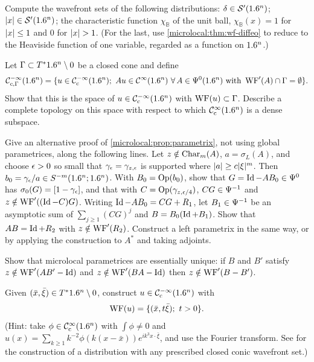\begin{exercise}\label{microlocal:ex:wf-examples}
  Compute the wavefront sets of the following distributions: $\delta\in\mathcal{S}'(1.6^n)$;
  $\lvert x\rvert\in\mathcal{S}'(1.6^n)$; the characteristic function $\chi_{\mathbb B}$ of the
  unit ball, $\chi_{\mathbb B}(x)=1$ for $\lvert x\rvert\le1$ and $0$ for $\lvert x\rvert>1$.
  (For the last, use \cref{microlocal:thm:wf-diffeo} to reduce to the
  Heaviside function of one variable, regarded as a function on $1.6^n$.)
\end{exercise}

\begin{exercise}\label{microlocal:ex:wf-gamma}
  Let $\Gamma\subset T^*1.6^n\setminus0$ be a closed cone and define
  \begin{equation*}
    \mathcal C^{-\infty}_{c,\Gamma}(1.6^n)=\{u\in\mathcal{C}^{-\infty}_{\mathrm{c}}(1.6^n);\
    Au\in\mathcal{C}^\infty(1.6^n)\ \forall\,A\in\Psi^{0}(1.6^n)\text{ with }\operatorname{WF}'(A)\cap\Gamma=\emptyset\}.
  \end{equation*}
  Show that this is the space of $u\in\mathcal{C}^{-\infty}_{\mathrm{c}}(1.6^n)$ with $\operatorname{WF}(u)\subset\Gamma$.
  Describe a complete topology on this space with respect to which
  $\mathcal{C}^\infty_{\mathrm{c}}(1.6^n)$ is a dense subspace.
\end{exercise}

\begin{exercise}\label{microlocal:ex:parametrix-direct}
  Give an alternative proof of \cref{microlocal:prop:parametrix}, not using
  global parametrices, along the following lines. Let $z\notin\operatorname{Char}_m(A)$, $a=\sigma_L(A)$,
  and choose $\epsilon>0$ so small that $\gamma_\epsilon=\gamma_{z,\epsilon}$ is supported
  where $\lvert a\rvert\ge c\lvert \xi\rvert^m$. Then $b_0=\gamma_\epsilon/a\in S^{-m}(1.6^n;1.6^n)$.
  With $B_0=\operatorname{Op}(b_0)$, show that $G=\operatorname{Id}-AB_0\in\Psi^{0}$ has
  $\sigma_0(G)=[1-\gamma_\epsilon]$, and that with $C=\operatorname{Op}(\gamma_{z,\epsilon/4})$,
  $CG\in\Psi^{-1}$ and $z\notin\operatorname{WF}'((\operatorname{Id}-C)G)$. Writing
  $\operatorname{Id}-AB_0=CG+R_1$, let $B_1\in\Psi^{-1}$ be an asymptotic sum of
  $\sum_{j\ge1}(CG)^j$ and $B=B_0(\operatorname{Id}+B_1)$. Show that $AB=\operatorname{Id}+R_2$ with
  $z\notin\operatorname{WF}'(R_2)$. Construct a left parametrix in the same way, or by
  applying the construction to $A^*$ and taking adjoints.
\end{exercise}

\begin{exercise}\label{microlocal:ex:uniqueness}
  Show that microlocal parametrices are essentially unique: if $B$ and $B'$
  satisfy $z\notin\operatorname{WF}'(AB'-\operatorname{Id})$ and $z\notin\operatorname{WF}'(BA-\operatorname{Id})$ then
  $z\notin\operatorname{WF}'(B-B')$.
\end{exercise}

\begin{exercise}\label{microlocal:ex:wf-ray}
  Given $(\bar x,\bar\xi)\in T^*1.6^n\setminus0$, construct $u\in\mathcal{C}^{-\infty}_{\mathrm{c}}(1.6^n)$ with
  \begin{equation*}
    \operatorname{WF}(u)=\{(\bar x,t\bar\xi);\ t>0\}.
  \end{equation*}
  (Hint: take $\phi\in\mathcal{C}^\infty_{\mathrm{c}}(1.6^n)$ with $\int\phi\ne0$ and
  $u(x)=\sum_{k\ge1}k^{-2}\phi(k(x-\bar x))e^{ik^3x\cdot\bar\xi}$, and use the
  Fourier transform. See \cite[Section~8.1]{Hormander-I} for the construction
  of a distribution with any prescribed closed conic wavefront set.)
\end{exercise}

